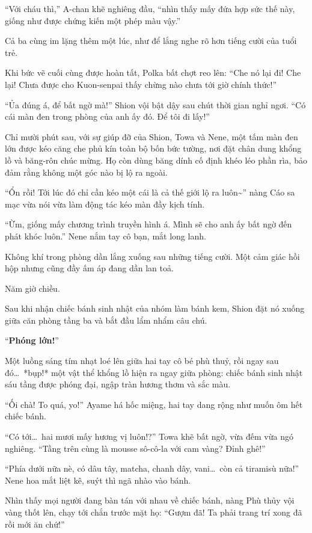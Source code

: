 \documentclass[../main.tex]{subfiles}
\begin{document}
``Với cháu thì,'' A-chan khẽ nghiêng đầu, ``nhìn thấy mấy đứa hợp sức thế này, giống như được chứng kiến một phép màu vậy.''

Cả ba cùng im lặng thêm một lúc, như để lắng nghe rõ hơn tiếng cười của tuổi trẻ.

Khi bức vẽ cuối cùng được hoàn tất, Polka bất chợt reo lên: ``Che nó lại đi! Che lại! Chưa được cho Kuon-senpai thấy chừng nào chưa tới giờ chính thức!''

``Ủa đúng á, để bất ngờ mà!'' Shion vội bật dậy sau chút thời gian nghỉ ngơi. ``Có cái màn đen trong phòng của anh ấy đó. Để tôi đi lấy!''

Chỉ mười phút sau, với sự giúp đỡ của Shion, Towa và Nene, một tấm màn đen lớn được kéo căng che phủ kín toàn bộ bốn bức tường, nơi đặt chân dung khổng lồ và băng-rôn chúc mừng. Họ còn dùng băng dính cố định khéo léo phần rìa, bảo đảm rằng không một góc nào bị lộ ra ngoài.

``Ổn rồi! Tới lúc đó chỉ cần kéo một cái là cả thế giới lộ ra luôn\~{}'' nàng Cáo sa mạc vừa nói vừa làm động tác kéo màn đầy kịch tính.

``Ừm, giống mấy chương trình truyền hình á. Mình sẽ cho anh ấy bất ngờ đến phát khóc luôn.'' Nene nắm tay cô bạn, mắt long lanh.

Không khí trong phòng dần lắng xuống sau những tiếng cười. Một cảm giác hồi hộp nhưng cũng đầy ấm áp đang dần lan toả.

\ct

Năm giờ chiều.

Sau khi nhận chiếc bánh sinh nhật của nhóm làm bánh kem, Shion đặt nó xuống giữa căn phòng tầng ba và bắt đầu lẩm nhẩm câu chú.

``\textbf{Phóng lớn!}''

Một luồng sáng tím nhạt loé lên giữa hai tay cô bé phù thuỷ, rồi ngay sau đó\dots\ *bụp!* một vật thể khổng lồ hiện ra ngay giữa phòng: chiếc bánh sinh nhật sáu tầng được phóng đại, ngập tràn hương thơm và sắc màu.

``Ối chà! To quá, yo!'' Ayame há hốc miệng, hai tay dang rộng như muốn ôm hết chiếc bánh.

``Có tới\dots\ hai mươi mấy hương vị luôn!?'' Towa khẽ bất ngờ, vừa đếm vừa ngó nghiêng. ``Tầng trên cùng là mousse sô-cô-la với cam vàng? Đỉnh ghê!''

``Phía dưới nữa nè, có dâu tây, matcha, chanh dây, vani\dots\ còn cả tiramisù nữa!'' Nene hoa mắt liệt kê, suýt thì ngã nhào vào bánh.

Nhìn thấy mọi người đang bàn tán với nhau về chiếc bánh, nàng Phù thủy vội vàng thốt lên, chạy tới chắn trước mặt họ: ``Gượm đã! Ta phải trang trí xong đã rồi mới ăn chứ!''
\end{document}
